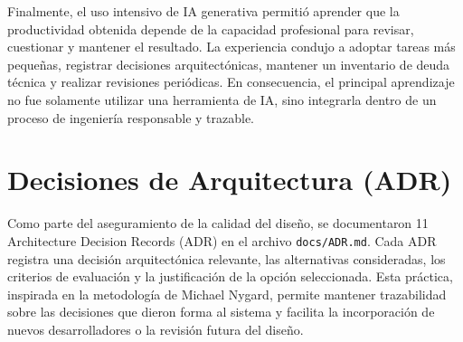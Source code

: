 \documentclass[final]{udpthesis}
\begin{document}
Finalmente, el uso intensivo de IA generativa permitió aprender que la productividad obtenida depende de la capacidad profesional para revisar, cuestionar y mantener el resultado. La experiencia condujo a adoptar tareas más pequeñas, registrar decisiones arquitectónicas, mantener un inventario de deuda técnica y realizar revisiones periódicas. En consecuencia, el principal aprendizaje no fue solamente utilizar una herramienta de IA, sino integrarla dentro de un proceso de ingeniería responsable y trazable.

\chapter{Decisiones de Arquitectura (ADR)}

Como parte del aseguramiento de la calidad del diseño, se documentaron 11 Architecture Decision Records (ADR) en el archivo \texttt{docs/ADR.md}. Cada ADR registra una decisión arquitectónica relevante, las alternativas consideradas, los criterios de evaluación y la justificación de la opción seleccionada. Esta práctica, inspirada en la metodología de Michael Nygard, permite mantener trazabilidad sobre las decisiones que dieron forma al sistema y facilita la incorporación de nuevos desarrolladores o la revisión futura del diseño.
\end{document}
